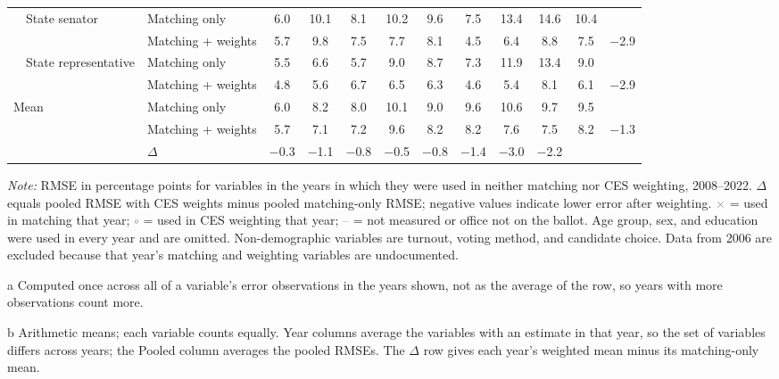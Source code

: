 \begin{table}[!htbp]
{\begin{threeparttable}
\begin{tabular}{llcccccccccc}
\addlinespace[0.1em]
~~State senator & Matching only & 6.0 & 10.1 & 8.1 & 10.2 & 9.6 & 7.5 & 13.4 & 14.6 & 10.4 & \\
 & Matching + weights & 5.7 & 9.8 & 7.5 & 7.7 & 8.1 & 4.5 & 6.4 & 8.8 & 7.5 & $-$2.9 \\
\addlinespace[0.1em]
~~State representative & Matching only & 5.5 & 6.6 & 5.7 & 9.0 & 8.7 & 7.3 & 11.9 & 13.4 & 9.0 & \\
 & Matching + weights & 4.8 & 5.6 & 6.7 & 6.5 & 6.3 & 4.6 & 5.4 & 8.1 & 6.1 & $-$2.9 \\
\midrule
Mean\tnote{b} & Matching only & 6.0 & 8.2 & 8.0 & 10.1 & 9.0 & 9.6 & 10.6 & 9.7 & 9.5 & \\
 & Matching + weights & 5.7 & 7.1 & 7.2 & 9.6 & 8.2 & 8.2 & 7.6 & 7.5 & 8.2 & $-$1.3 \\
 & $\Delta$ & $-$0.3 & $-$1.1 & $-$0.8 & $-$0.5 & $-$0.8 & $-$1.4 & $-$3.0 & $-$2.2 & & \\
\bottomrule
\end{tabular}
\begin{tablenotes}
\footnotesize
\item \textit{Note:} RMSE in percentage points for variables in the years in which they were used in neither matching nor CES weighting, 2008--2022. $\Delta$ equals pooled RMSE with CES weights minus pooled matching-only RMSE; negative values indicate lower error after weighting. \textcolor{gray}{$\times$} = used in matching that year; \textcolor{gray}{$\circ$} = used in CES weighting that year; \textcolor{gray}{--} = not measured or office not on the ballot. Age group, sex, and education were used in every year and are omitted. Non-demographic variables are turnout, voting method, and candidate choice. Data from 2006 are excluded because that year's matching and weighting variables are undocumented.
\item[a] Computed once across all of a variable's error observations in the years shown, not as the average of the row, so years with more observations count more.
\item[b] Arithmetic means; each variable counts equally. Year columns average the variables with an estimate in that year, so the set of variables differs across years; the Pooled column averages the pooled RMSEs. The $\Delta$ row gives each year's weighted mean minus its matching-only mean.
\end{tablenotes}
\end{threeparttable}%
}
\end{table}